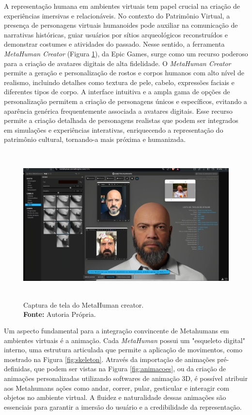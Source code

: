 A representação humana em ambientes virtuais tem papel crucial na criação de experiências imersivas e relacionáveis. No contexto do Patrimônio Virtual, a presença de personagens virtuais humanoides pode auxiliar na comunicação de narrativas históricas, guiar usuários por sítios arqueológicos reconstruídos e demonstrar costumes e atividades do passado. Nesse sentido, a ferramenta \textit{MetaHuman Creator} (Figura \ref{fig:metahuman creator}), da Epic Games, surge como um recurso poderoso para a criação de avatares digitais de alta fidelidade.
O \textit{MetaHuman Creator} permite a geração e personalização de rostos e corpos humanos com alto nível de realismo, incluindo detalhes como textura de pele, cabelo, expressões faciais e diferentes tipos de corpo. A interface intuitiva e a ampla gama de opções de personalização permitem a criação de personagens únicos e específicos, evitando a aparência genérica frequentemente associada a avatares digitais. Esse recurso permite a criação detalhada de personagens realistas que podem ser integrados em simulações e experiências interativas, enriquecendo a representação do patrimônio cultural, tornando-a mais próxima e humanizada.

\begin{figure}[H]
    \centering
    \includegraphics[height=8cm, keepaspectratio]{img/Metahuman.png}
    \caption{Captura de tela do MetaHuman creator. \\
        \textbf{Fonte:} Autoria Própria.}
    \label{fig:metahuman creator}
\end{figure}

Um aspecto fundamental para a integração convincente de Metahumans em ambientes virtuais é a animação. Cada \textit{MetaHuman} possui um "esqueleto digital" interno, uma estrutura articulada que permite a aplicação de movimentos, como mostrado na Figura \ref{fig:skeleton}. Através da importação de animações pré-definidas, que podem ser vistas na Figura \ref{fig:animacoes}, ou da criação de animações personalizadas utilizando softwares de animação 3D, é possível atribuir aos Metahumans ações como andar, correr, pular, gesticular e interagir com objetos no ambiente virtual. A fluidez e naturalidade dessas animações são essenciais para garantir a imersão do usuário e a credibilidade da representação.


